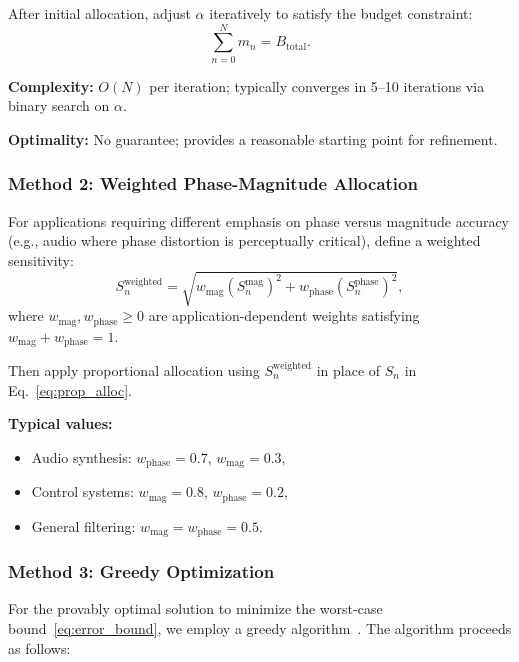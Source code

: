 After initial allocation, adjust $\alpha$ iteratively to satisfy the budget constraint:
\begin{equation}
\sum_{n=0}^{N} m_n = B_{\text{total}}.
\label{eq:budget_constraint}
\end{equation}

\textbf{Complexity:} $O(N)$ per iteration; typically converges in 5--10 iterations via binary search on $\alpha$.

\textbf{Optimality:} No guarantee; provides a reasonable starting point for refinement.

\subsubsection{Method 2: Weighted Phase-Magnitude Allocation}
\label{sec:weighted_alloc}

For applications requiring different emphasis on phase versus magnitude accuracy (e.g., audio where phase distortion is perceptually critical), define a weighted sensitivity:
\begin{equation}
S_n^{\text{weighted}} = \sqrt{w_{\text{mag}} (S_n^{\text{mag}})^2 + w_{\text{phase}} (S_n^{\text{phase}})^2},
\label{eq:weighted_sens}
\end{equation}
where $w_{\text{mag}}, w_{\text{phase}} \geq 0$ are application-dependent weights satisfying $w_{\text{mag}} + w_{\text{phase}} = 1$.

Then apply proportional allocation using $S_n^{\text{weighted}}$ in place of $S_n$ in Eq.~\eqref{eq:prop_alloc}.

\textbf{Typical values:}
\begin{itemize}
\item Audio synthesis: $w_{\text{phase}} = 0.7$, $w_{\text{mag}} = 0.3$,
\item Control systems: $w_{\text{mag}} = 0.8$, $w_{\text{phase}} = 0.2$,
\item General filtering: $w_{\text{mag}} = w_{\text{phase}} = 0.5$.
\end{itemize}

\subsubsection{Method 3: Greedy Optimization}
\label{sec:greedy_algo}

For the provably optimal solution to minimize the worst-case bound~\eqref{eq:error_bound}, we employ a greedy algorithm~\cite{Gustafsson2007}. The algorithm proceeds as follows:

